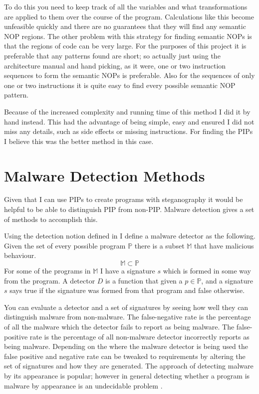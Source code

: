 \documentclass[10pt,]{book}
\begin{document}
To do this you need to keep track of all the variables and what
transformations are applied to them over the course of the program.
Calculations like this become unfeasible quickly and there are no
guarantees that they will find any semantic NOP regions. The other
problem with this strategy for finding semantic NOPs is that the regions
of code can be very large. For the purposes of this project it is
preferable that any patterns found are short; so actually just using the
architecture manual and hand picking, as it were, one or two instruction
sequences to form the semantic NOPs is preferable. Also for the
sequences of only one or two instructions it is quite easy to find every
possible semantic NOP pattern.

Because of the increased complexity and running time of this method I
did it by hand instead. This had the advantage of being simple, easy and
ensured I did not miss any details, such as side effects or missing
instructions. For finding the PIPs I believe this was the better method
in this case.

\section{Malware Detection Methods}

Given that I can use PIPs to create programs with steganography it would
be helpful to be able to distinguish PIP from non-PIP. Malware detection
gives a set of methods to accomplish this.

Using the detection notion defined in \autocite{Preda:2007ky} I define a
malware detector as the following. Given the set of every possible
program $\mathbb{P}$ there is a subset $\mathbb{M}$ that have malicious
behaviour. \[\mathbb{M\subset P}\] For some of the programs in
$\mathbb{M}$ I have a signature $s$ which is formed in some way from the
program. A detector $D$ is a function that given a $p\in\mathbb{P}$, and
a signature $s$ says true if the signature was formed from that program
and false otherwise.

You can evaluate a detector and a set of signatures by seeing how well
they can distinguish malware from non-malware. The false-negative rate
is the percentage of all the malware which the detector fails to report
as being malware. The false-positive rate is the percentage of all
non-malware detector incorrectly reports as being malware. Depending on
the where the malware detector is being used the false positive and
negative rate can be tweaked to requirements by altering the set of
signatures and how they are generated. The approach of detecting malware
by its appearance is popular; however in general detecting whether a
program is malware by appearance is an undecidable problem
\autocite{Cohen:1987wt}\autocite{Shyamasundar:2010tl}.
\end{document}
